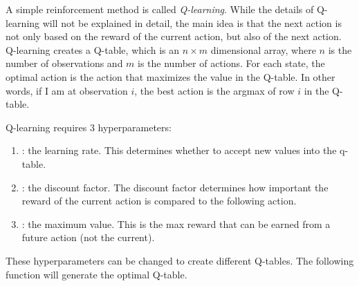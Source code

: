 A simple reinforcement method is called \emph{Q-learning}.
While the details of Q-learning will not be explained in detail, the main idea is that the next action is not only based on the reward of the current action, but also of the next action.
Q-learning creates a Q-table, which is an $n\times m$ dimensional array, where $n$ is the number of observations and $m$ is the number of actions.
For each state, the optimal action is the action that maximizes the value in the Q-table.
In other words, if I am at observation $i$, the best action is the argmax of row $i$ in the Q-table.

Q-learning requires 3 hyperparameters:
\begin{enumerate}
\item {}: the learning rate. This determines whether to accept new values into the q-table.
\item {}: the discount factor. The discount factor determines how important the reward of the current action is compared to the following action.
\item {}: the maximum value. This is the max reward that can be earned from a future action (not the current).
\end{enumerate}
These hyperparameters can be changed to create different Q-tables. The following function will generate the optimal Q-table.

